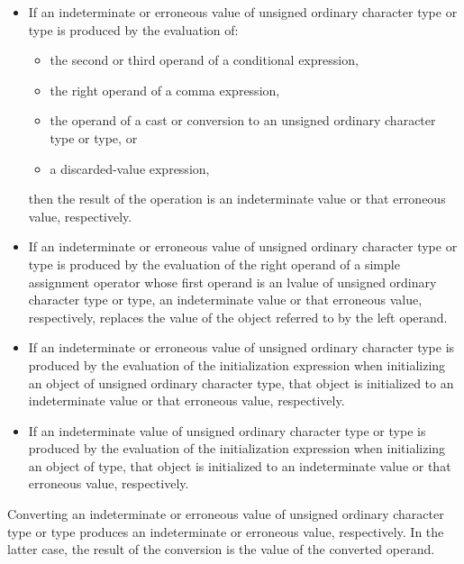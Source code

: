 \begin{adjustwidth}{0.5cm}{0.5cm}
\begin{itemize}
\item
  If an indeterminate or erroneous value of
  unsigned ordinary character type
  or  type
  is produced by the evaluation of:
  \begin{itemize}
  \item
    the second or third operand of a conditional expression,
  \item
    the right operand of a comma expression,
  \item
    the operand of a cast or conversion
    to an unsigned ordinary character type
    or  type, or
  \item
    a discarded-value expression,
  \end{itemize}
  then the result of the operation is an indeterminate value or
  that erroneous value, respectively.
\item
  If an indeterminate or erroneous value of
  unsigned ordinary character type or  type
  is produced by the evaluation of
  the right operand of a simple assignment operator
  whose first operand is an lvalue of
  unsigned ordinary character type or  type,
  an indeterminate value or that erroneous value, respectively, replaces
  the value of the object referred to by the left operand.
\item
  If an indeterminate or erroneous value of unsigned ordinary character type
  is produced by the evaluation of the initialization expression
  when initializing an object of unsigned ordinary character type,
  that object is initialized to an indeterminate
  value or that erroneous value, respectively.
\item
  If an indeterminate value of
  unsigned ordinary character type or  type
  is produced by the evaluation of the initialization expression
  when initializing an object of  type,
  that object is initialized to an indeterminate value or
  that erroneous value, respectively.
\end{itemize}
Converting an indeterminate or erroneous value of
unsigned ordinary character type or  type
produces an indeterminate or erroneous value, respectively.
In the latter case,
the result of the conversion is the value of the converted operand.


\end{adjustwidth}

